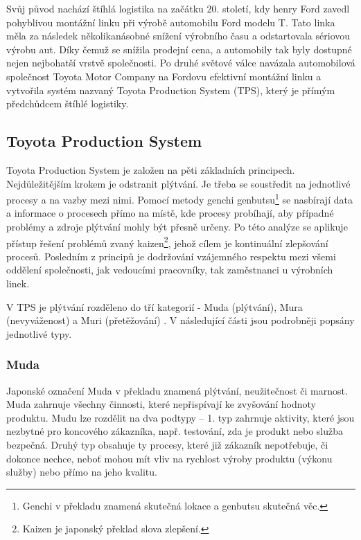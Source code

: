 Svůj původ nachází štíhlá logistika na začátku 20. století, kdy henry Ford zavedl pohyblivou montážní linku při výrobě automobilu Ford modelu T. Tato linka měla za následek několikanásobné snížení výrobního času a odstartovala sériovou výrobu aut. Díky čemuž se snížila prodejní cena, a  automobily tak byly dostupné nejen nejbohatší vrstvě společnosti. 
Po druhé světové válce navázala automobilová společnost Toyota Motor Company na Fordovu efektivní montážní linku a vytvořila systém nazvaný Toyota Production System (TPS), který je přímým předchůdcem štíhlé logistiky.\cite{bib:seven}

\subsection{Toyota Production System}

Toyota Production System je založen na pěti základních principech. Nejdůležitějším krokem je odstranit plýtvání. Je třeba se soustředit na jednotlivé procesy a na vazby mezi nimi. Pomocí metody genchi genbutsu\footnote{Genchi v překladu znamená skutečná lokace a genbutsu skutečná věc.} se nasbírají data a informace o procesech přímo na místě, kde procesy probíhají, aby případné problémy a zdroje plýtvání mohly být přesně určeny. Po této analýze se aplikuje přístup řešení problémů zvaný kaizen\footnote{Kaizen je japonský překlad slova zlepšení.}, jehož cílem je kontinuální zlepšování procesů. Posledním z principů je  dodržování vzájemného respektu mezi všemi oddělení společnosti, jak vedoucími pracovníky, tak zaměstnanci u výrobních linek. \cite{bib:seven}

V TPS je plýtvání rozděleno do tří kategorií - Muda (plýtvání), Mura (nevyváženost) a Muri (přetěžování) \cite{bib:LW3}. V následující části jsou podrobněji popsány jednotlivé typy.

\subsubsection*{Muda}

Japonské označení Muda v překladu znamená plýtvání, neužitečnost či marnost. Muda zahrnuje všechny činnosti, které nepřispívají ke zvyšování hodnoty produktu. Mudu lze rozdělit na dva podtypy -- 1. typ zahrnuje aktivity, které jsou nezbytné pro koncového zákazníka, např. testování, zda je produkt nebo služba bezpečná. Druhý typ obsahuje ty procesy, které již zákazník nepotřebuje, či dokonce nechce, neboť mohou mít vliv na rychlost výroby produktu (výkonu služby) nebo přímo na jeho kvalitu.

